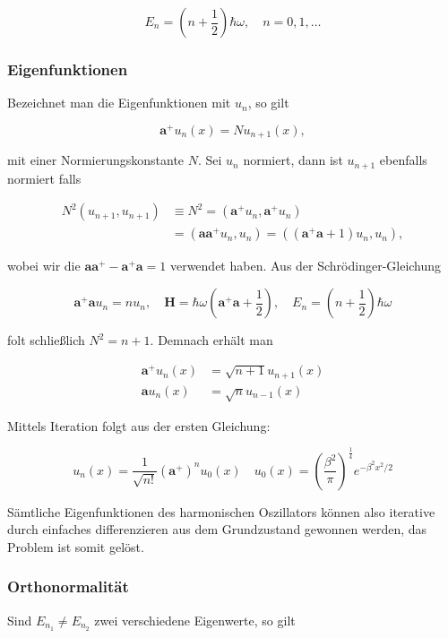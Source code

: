 \documentclass[10pt, letterpaper]{article}
\begin{document}
$$
E_{n}=\left(n+\frac{1}{2}\right) \hbar \omega, \quad n=0,1, \ldots
$$

\subsubsection*{Eigenfunktionen}
Bezeichnet man die Eigenfunktionen mit $u_{n}$, so gilt

$$
\mathbf{a}^{+} u_{n}(x)=N u_{n+1}(x),
$$

mit einer Normierungskonstante $N$. Sei $u_{n}$ normiert, dann ist $u_{n+1}$ ebenfalls normiert falls

$$
\begin{aligned}
N^{2}\left(u_{n+1}, u_{n+1}\right) & \equiv N^{2}=\left(\mathbf{a}^{+} u_{n}, \mathbf{a}^{+} u_{n}\right) \\
& =\left(\mathbf{a} \mathbf{a}^{+} u_{n}, u_{n}\right)=\left(\left(\mathbf{a}^{+} \mathbf{a}+1\right) u_{n}, u_{n}\right),
\end{aligned}
$$

wobei wir die $\mathbf{a} \mathbf{a}^{+}-\mathbf{a}^{+} \mathbf{a}=1$ verwendet haben. Aus der Schrödinger-Gleichung

$$
\mathbf{a}^{+} \mathbf{a} u_{n}=n u_{n}, \quad \mathbf{H}=\hbar \omega\left(\mathbf{a}^{+} \mathbf{a}+\frac{1}{2}\right), \quad E_{n}=\left(n+\frac{1}{2}\right) \hbar \omega
$$

folt schließlich $N^{2}=n+1$. Demnach erhält man

$$
\begin{aligned}
\mathbf{a}^{+} u_{n}(x) & =\sqrt{n+1} u_{n+1}(x) \\
\mathbf{a} u_{n}(x) & =\sqrt{n} u_{n-1}(x)
\end{aligned}
$$

Mittels Iteration folgt aus der ersten Gleichung:

$$
u_{n}(x)=\frac{1}{\sqrt{n!}}\left(\mathbf{a}^{+}\right)^{n} u_{0}(x) \quad u_{0}(x)=\left(\frac{\beta^{2}}{\pi}\right)^{\frac{1}{4}} e^{-\beta^{2} x^{2} / 2}
$$

Sämtliche Eigenfunktionen des harmonischen Oszillators können also iterative durch einfaches differenzieren aus dem Grundzustand gewonnen werden, das Problem ist somit gelöst.

\subsubsection*{Orthonormalität}
Sind $E_{n_{1}} \neq E_{n_{2}}$ zwei verschiedene Eigenwerte, so gilt
\end{document}
